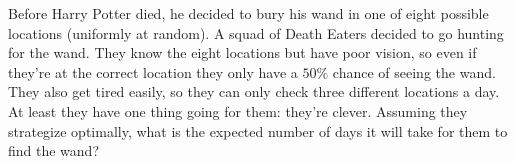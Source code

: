 Before Harry Potter died, he decided to bury his wand in one of eight possible locations (uniformly at random). A squad of Death Eaters decided to go hunting for the wand. They know the eight locations but have poor vision, so even if they're at the correct location they only have a $50\%$ chance of seeing the wand. They also get tired easily, so they can only check three different locations a day. At least they have one thing going for them: they're clever. Assuming they strategize optimally, what is the expected number of days it will take for them to find the wand?